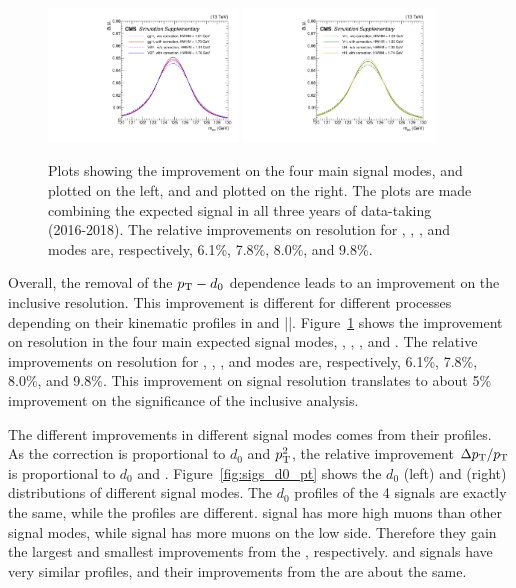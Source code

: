 \begin{figure}[!htb]
      \centering
      \includegraphics[width=0.45\textwidth]{pics/muon_corr/GeoFit/performance/ggHVBF.pdf}
      \includegraphics[width=0.45\textwidth]{pics/muon_corr/GeoFit/performance/VHttH.pdf}
      \caption{Plots showing the \GeoFit improvement on the four main \hmm signal modes, 
               \ggH and \qqH plotted on the left, and \VH and \ttH plotted on the right.
               The plots are made combining the expected signal in all three years of data-taking (2016-2018).
               The relative improvements on \mmm resolution for \ggH, \qqH, \VH, and \ttH modes are, respectively,
               6.1\%, 7.8\%, 8.0\%, and 9.8\%.
               }
      \label{fig:geofit_sigs}
\end{figure}

Overall, the removal of the $p_{\mathrm{T}}-d_0$ dependence leads to an improvement on the inclusive \mmm resolution.
This improvement is different for different processes depending on their kinematic profiles in \pt and |\eta|.
Figure~\ref{fig:geofit_sigs} shows the improvement on \mmm resolution in the four main expected signal modes, \ggH, \qqH, \VH, and \ttH.
The relative improvements on \mmm resolution for \ggH, \qqH, \VH, and \ttH modes are, 
respectively, 6.1\%, 7.8\%, 8.0\%, and 9.8\%.
This improvement on signal resolution translates to about 5\% improvement on the significance of the inclusive \hmm analysis.

The different improvements in different signal modes comes from their \pt profiles.
As the correction is proportional to $d_0$ and $p_{\mathrm{T}}^{2}$, 
the relative improvement $\Delta p_{\mathrm{T}} / p_{\mathrm{T}}$ is proportional to $d_0$ and \pt. 
Figure~\ref{fig:sigs_d0_pt} shows the $d_0$ (left) and \pt (right) distributions of different signal modes.
The $d_0$ profiles of the 4 signals are exactly the same,
while the \pt profiles are different.
\ttH signal has more high \pt muons than other signal modes,
while \ggH signal has more muons on the low \pt side.
Therefore they gain the largest and smallest improvements from the \GeoFit, respectively.
\qqH and \VH signals have very similar \pt profiles, 
and their improvements from the \GeoFit are about the same.

